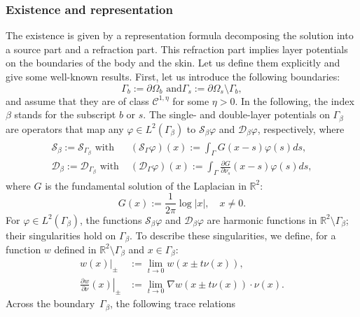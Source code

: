 \documentclass[final]{siamltex}
\numberwithin{equation}{section}
\numberwithin{figure}{section}
\numberwithin{table}{section}
\begin{document}
\subsubsection{Existence and representation}

The existence is given by a representation formula decomposing the
solution into a source part and a refraction part. This refraction
part implies layer potentials on the boundaries of the body and
the skin. Let us define them explicitly and give some well-known
results. First, let us introduce the following boundaries:
\[
\Gamma_{b}:=\partial\Omega_{b}\mbox{ and
}\Gamma_{s}:=\partial\Omega_{s}\setminus\Gamma_{b},
\]
and assume that they are of class $\mathcal{C}^{1,\eta}$ for some
$\eta >0$. In the following, the index $\beta$ stands for the
subscript $b$ or $s$. The single- and double-layer potentials on
$\Gamma_{\beta}$ are operators that map any $\varphi\in
L^{2}(\Gamma_{\beta})$ to $\mathcal{S}_{\beta} \varphi$ and
$\mathcal{D}_{\beta} \varphi$, respectively, where
\[
\begin{aligned}\begin{aligned}\mathcal{S}_{\beta} := \mathcal{S}_{\Gamma_\beta} \mbox{ with } &
 (\mathcal{S}_\Gamma \varphi)(x):=\int_{\Gamma}G(x-s)\varphi(s)ds,\\
\mathcal{D}_{\beta} := \mathcal{D}_{\Gamma_\beta} \mbox{ with }  &
(\mathcal{D}_{\Gamma}\varphi)(x)
 :=\int_{\Gamma}\frac{\partial
G}{\partial\nu_{s}}(x-s)\varphi(s)ds,
\end{aligned}
\end{aligned}
\]
 where $G$ is the fundamental solution of the Laplacian in
 $\mathbb{R}^{2}$:
 \begin{equation} \label{defG}
 G(x) := \frac{1}{2\pi} \log |x|, \quad x \neq 0.
 \end{equation}
For $\varphi\in L^{2}(\Gamma_{\beta})$, the functions
$\mathcal{S}_{\beta}\varphi$ and $\mathcal{D}_{\beta}\varphi$ are
harmonic functions in $\mathbb{R}^{2}\setminus\Gamma_{\beta}$;
their singularities hold on $\Gamma_{\beta}$. To describe these
singularities, we define, for a function $w$ defined in
$\mathbb{R}^{2}\setminus\Gamma_{\beta}$ and $x\in\Gamma_{\beta}$:
\[
\begin{aligned}\left.w(x)\right|_{\pm} & :=\lim_{t\rightarrow0}w(x\pm t\nu(x)),\\
\left.\frac{\partial w}{\partial\nu}(x)\right|_{\pm} & :=\lim_{t\rightarrow0}
 \nabla w(x\pm t\nu(x)) \cdot \nu(x) .
\end{aligned}
\]
 Across the boundary~$\Gamma_{\beta}$, the following  trace relations
\end{document}
